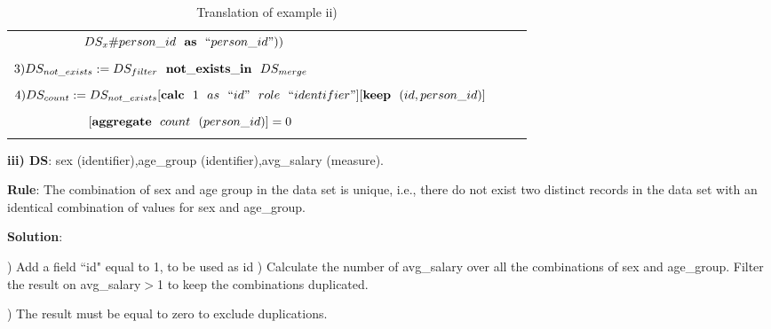 \begin{table}
\begin{center}
{\begin{tabular}{|l|l|l|}
	       $\qquad\qquad\quad \ \ DS_x\#person\_id  \ \ \bold{as} \ \  ``person\_id"))$ 
 \\ \\
                                                $  3) DS_{not\_exists}:=DS_{filter} \ \ \bold{not\_exists\_in}   \ \ DS_{merge} $      \\  \\ 
                                      $ 4) DS_{count}:=DS_{not\_exists}[\bold{calc} \ \ 1 \ \ as \ \ ``id" \ \  role  \ \ `` identifier"][\bold{keep} \ \ (id,person\_id)] \ \ $  \\  \\ 
                                       $\qquad\qquad\qquad[\bold{aggregate} \ \ count \ \  (person\_id)]  =0$   \\  \\ 
\hline
\end{tabular}}
\caption{Translation of example ii)}
\centering
\label{Tab1-3}
\end{center}
\end{table}


\bigskip\noindent
\textbf{iii) DS}: sex (identifier),age\_group (identifier),avg\_salary (measure). 
 

\bigskip\noindent
\textbf{Rule}: The combination of sex and age group in the data set is unique, i.e., there do not exist two distinct records in the data set with an identical combination of values for sex and age\_group.


\bigskip\noindent
\textbf{Solution}: 

) Add a field ``id" equal to 1, to be used as id
) Calculate the number of avg\_salary over all the combinations of sex and age\_group. Filter the result on avg\_salary$>$1 to keep the combinations duplicated.

) The result must be equal to zero to exclude duplications.




